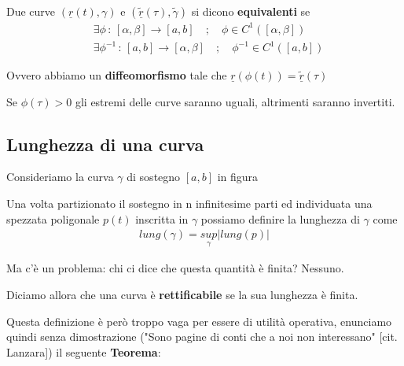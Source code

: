 Due curve $(\underline{r}(t),\gamma)$ e $ (\tilde{\underline{r}}(\tau), \tilde{\gamma})$ si dicono \textbf{equivalenti} se
\begin{align}
&\exists \phi \, : \, [\alpha,\beta] \longrightarrow [a,b] \quad ; \quad \phi \in C^1([\alpha,\beta])\\
&\exists \phi^{-1} \, : \, [a,b] \longrightarrow [\alpha,\beta]  \quad ; \quad  \phi^{-1} \in C^1([a,b])
\end{align}

Ovvero abbiamo un \textbf{diffeomorfismo} tale che $\underline{r}(\phi(t))=\tilde{\underline{r}}(\tau)$

Se $\phi(\tau)>0$ gli estremi delle curve saranno uguali, altrimenti saranno invertiti.

\subsection{Lunghezza di una curva}

Consideriamo la curva $\gamma$ di sostegno $[a,b]$ in figura
\begin{figure}[!htb]
\end{figure}

Una volta partizionato il sostegno in n infinitesime parti ed  individuata una spezzata poligonale $p(t)$ inscritta in $\gamma$ possiamo definire la lunghezza di $\gamma$ come
\begin{align}
lung(\gamma) = \underset{\gamma}{sup}|lung(p)|
\end{align}

Ma c'è un problema: chi ci dice che questa quantità è finita? Nessuno.

Diciamo allora che una curva è \textbf{rettificabile} se la sua lunghezza è finita.

Questa definizione è però troppo vaga per essere di utilità operativa, enunciamo quindi senza dimostrazione ("Sono pagine di conti che a noi non interessano" [cit. Lanzara]) il seguente \textbf{Teorema}:

